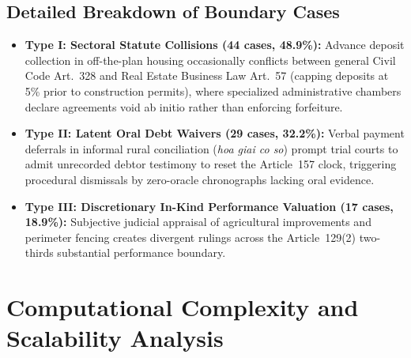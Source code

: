 \documentclass[11pt,a4paper]{article}
\begin{document}
\subsection{Detailed Breakdown of Boundary Cases}
\begin{itemize}[leftmargin=*, noitemsep, topsep=2pt]
    \item \textbf{Type I: Sectoral Statute Collisions (44 cases, 48.9\%):} Advance deposit collection in off-the-plan housing occasionally conflicts between general Civil Code Art.~328 and Real Estate Business Law Art.~57 (capping deposits at 5\% prior to construction permits), where specialized administrative chambers declare agreements void ab initio rather than enforcing forfeiture.
    \item \textbf{Type II: Latent Oral Debt Waivers (29 cases, 32.2\%):} Verbal payment deferrals in informal rural conciliation (\textit{hoa giai co so}) prompt trial courts to admit unrecorded debtor testimony to reset the Article~157 clock, triggering procedural dismissals by zero-oracle chronographs lacking oral evidence.
    \item \textbf{Type III: Discretionary In-Kind Performance Valuation (17 cases, 18.9\%):} Subjective judicial appraisal of agricultural improvements and perimeter fencing creates divergent rulings across the Article~129(2) two-thirds substantial performance boundary.
\end{itemize}

\section{Computational Complexity and Scalability Analysis}
\label{sec:appendix_complexity}
\end{document}
